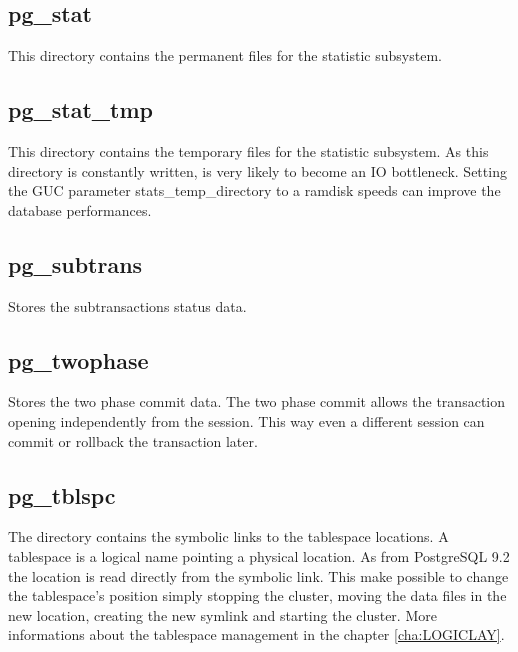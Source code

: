 \subsection{pg\_stat}
This directory contains the permanent files for the statistic subsystem. 

\subsection{pg\_stat\_tmp}
This directory contains the temporary files for the statistic subsystem. 
As this directory is constantly written, is very likely to become an 
IO bottleneck. Setting the GUC parameter stats\_temp\_directory to a ramdisk 
speeds can improve the database performances.


\subsection{pg\_subtrans}
Stores the subtransactions status data. 

\subsection{pg\_twophase}
Stores the two phase commit data. The two phase commit allows the transaction 
opening independently from the session. This way even a different session can 
commit or rollback the transaction later.

\subsection{pg\_tblspc}
\label{sub:TABLESPACE}
The directory contains the symbolic links to the tablespace locations.
A tablespace is a logical name pointing a physical location. As from PostgreSQL 
9.2 the location is read directly from the symbolic link. This make possible 
to change the tablespace's position simply stopping the cluster, moving the 
data files in the new location, creating the new symlink and starting the 
cluster.
More informations about the tablespace management in the 
chapter \ref{cha:LOGICLAY}. 


